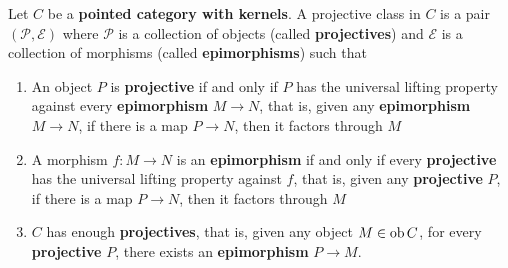 \documentclass{article}
\begin{document}
\begin{definition}
    Let $C$ be a \textbf{pointed category with kernels}. A projective class in $C$ is a pair $(\mathcal{P}, \mathcal{E})$ where $\mathcal{P}$ is a collection of objects (called \textbf{projectives}) and $\mathcal{E}$ is a collection of morphisms (called \textbf{epimorphisms}) such that
    \begin{enumerate}
        \item An object $P$ is \textbf{projective} if and only if $P$ has the universal lifting property against every \textbf{epimorphism} $M \to N$, that is, given any \textbf{epimorphism} $M \to N$, if there is a map $P \to N$, then it factors through $M$
        \begin{center}
        \end{center}

        \item A morphism $f: M \to N$ is an \textbf{epimorphism} if and only if every \textbf{projective} has the universal lifting property against $f$, that is, given any \textbf{projective} $P$, if there is a map $P \to N$, then it factors through $M$

        \begin{center}
        \end{center}

        \item $C$ has enough \textbf{projectives}, that is, given any object $M \in \operatorname{ob} C$, for every \textbf{projective} $P$, there exists an \textbf{epimorphism} $P \to M$.
    \end{enumerate}
\end{definition}
\end{document}

